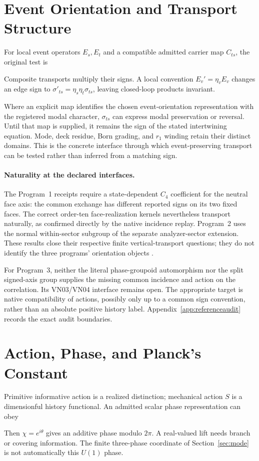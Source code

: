 \section{Event Orientation and Transport Structure}\label{sec:orientation}
For local event operators $E_s,E_t$ and a compatible admitted carrier map $C_{ts}$, the original test is

Composite transports multiply their signs. A local convention $E_v'=\eta_vE_v$ changes an edge sign to $\sigma'_{ts}=\eta_s\eta_t\sigma_{ts}$, leaving closed-loop products invariant.

Where an explicit map identifies the chosen event-orientation representation with the registered modal character, $\sigma_{ts}$ can express modal preservation or reversal. Until that map is supplied, it remains the sign of the stated intertwining equation. Mode, deck residue, Born grading, and $r_1$ winding retain their distinct domains. This is the concrete interface through which event-preserving transport can be tested rather than inferred from a matching sign.

\paragraph{Naturality at the declared interfaces.}
The Program~1 receipts require a state-dependent $C_4$ coefficient for the neutral face axis: the common exchange has different reported signs on its two fixed faces. The correct order-ten face-realization kernels nevertheless transport naturally, as confirmed directly by the native incidence replay. Program~2 uses the normal within-sector subgroup of the separate analyzer-sector extension. These results close their respective finite vertical-transport questions; they do not identify the three programs' orientation objects \citep{cave2026p4receipts,cave2026draft6replays}.

For Program~3, neither the literal phase-groupoid automorphism nor the split signed-axis group supplies the missing common incidence and action on the correlation. Its VN03/VN04 interface remains open. The appropriate target is native compatibility of actions, possibly only up to a common sign convention, rather than an absolute positive history label. Appendix~\ref{app:referenceaudit} records the exact audit boundaries.

\section{Action, Phase, and Planck's Constant}\label{sec:hbar}
Primitive informative action is a realized distinction; mechanical action $S$ is a dimensionful history functional. An admitted scalar phase representation can obey

Then $\chi=e^{i\theta}$ gives an additive phase modulo $2\pi$. A real-valued lift needs branch or covering information. The finite three-phase coordinate of Section~\ref{sec:mode} is not automatically this $U(1)$ phase.

